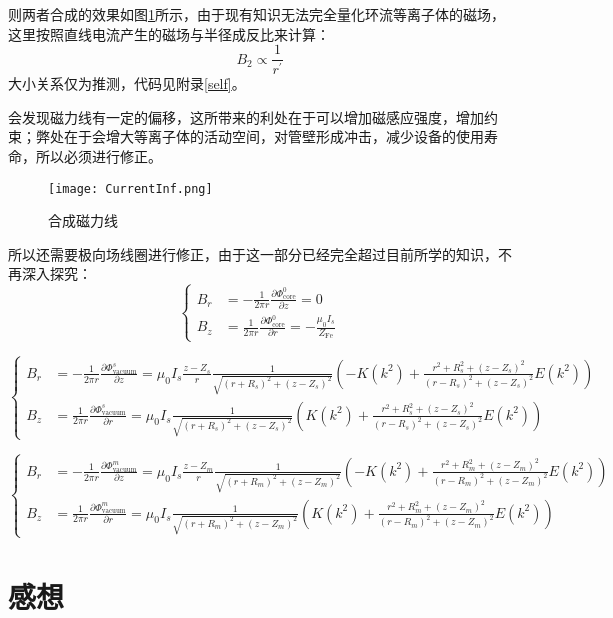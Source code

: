 \documentclass[a4paper,12pt]{article}
\begin{document}
\begin{CJK}{UTF8}{gbsn}
则两者合成的效果如图\ref{curInf}所示，由于现有知识无法完全量化环流等离子体的磁场，这里按照直线电流产生的磁场与半径成反比来计算：
\begin{equation}
    B_2 \propto \frac{1}{r^\prime}
\end{equation}
大小关系仅为推测，代码见附录\ref{self}。

会发现磁力线有一定的偏移，这所带来的利处在于可以增加磁感应强度，增加约束；弊处在于会增大等离子体的活动空间，对管壁形成冲击，减少设备的使用寿命，所以必须进行修正。

\begin{figure}[H]
    \centering
    \texttt{[image: CurrentInf.png]}
    \caption{合成磁力线}\label{curInf}
\end{figure}

所以还需要极向场线圈进行修正，由于这一部分已经完全超过目前所学的知识\cite{jtext}，不再深入探究：
$$
\begin{cases}
    B_r &= -\frac{1}{2\pi r}\frac{\partial \Phi^0_\text{core}}{\partial z}=0 \\
    B_z &= \frac{1}{2\pi r}\frac{\partial \Phi^0_\text{core}}{\partial r} = -\frac{\mu_0I_s}{Z_\text{Fe}}
\end{cases}
$$

$$
\begin{cases}
    B_r &= -\frac{1}{2\pi r}\frac{\partial \Phi^s_\text{vacuum}}{\partial z} = \mu_0I_s\frac{z-Z_s}{r}\frac{1}{\sqrt{(r+R_s)^2+(z-Z_s)^2}}\left(-K(k^2)+\frac{r^2+R_s^2+(z-Z_s)^2}{(r-R_s)^2+(z-Z_s)^2}E(k^2)\right)\\
    B_z &= \frac{1}{2\pi r}\frac{\partial \Phi^s_\text{vacuum}}{\partial r} = \mu_0I_s\frac{1}{\sqrt{(r+R_s)^2+(z-Z_s)^2}}\left(K(k^2)+\frac{r^2+R_s^2+(z-Z_s)^2}{(r-R_s)^2+(z-Z_s)^2}E(k^2)\right)
\end{cases}
$$

$$
\begin{cases}
    B_r &= -\frac{1}{2\pi r}\frac{\partial \Phi^m_\text{vacuum}}{\partial z} = \mu_0I_s\frac{z-Z_m}{r}\frac{1}{\sqrt{(r+R_m)^2+(z-Z_m)^2}}\left(-K(k^2)+\frac{r^2+R_m^2+(z-Z_m)^2}{(r-R_m)^2+(z-Z_m)^2}E(k^2)\right)\\
    B_z &= \frac{1}{2\pi r}\frac{\partial \Phi^m_\text{vacuum}}{\partial r} = \mu_0I_s\frac{1}{\sqrt{(r+R_m)^2+(z-Z_m)^2}}\left(K(k^2)+\frac{r^2+R_m^2+(z-Z_m)^2}{(r-R_m)^2+(z-Z_m)^2}E(k^2)\right)
\end{cases}
$$

\section{感想}


\end{CJK}
\end{document}
